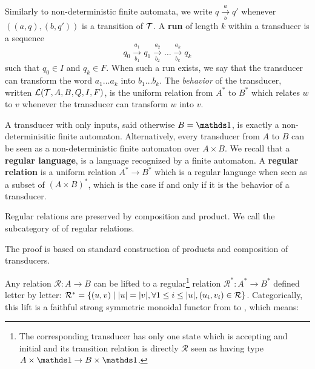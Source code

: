 Similarly to non-deterministic finite automata, we write $q \xrightarrow[b]{a} q'$ whenever $((a,q),(b,q'))$ is a transition of ${\mathcal{T}}$. A \textbf{run} of length $k$ within a transducer is a sequence
\[ q_0 \xrightarrow[b_1]{a_1} q_1 \xrightarrow[b_2]{a_2} \dots \xrightarrow[b_k]{a_k} q_k \]
such that $q_0 \in I$ and $q_k \in F$. When such a run exists, we say that the transducer can transform the word $a_1\dots a_k$ into $b_1\dots b_k$. The \emph{behavior} of the transducer, written ${\mathcal{L}}({\mathcal{T}}, A, B, Q, I, F)$, is the uniform relation from $A^*$ to $B^*$ which relates $w$ to $v$ whenever the transducer can transform $w$ into $v$. 

A transducer with only inputs, said otherwise $B=\one$, is exactly a non-determinisitic finite automaton. Alternatively, every transducer from $A$ to $B$ can be seen as a non-deterministic finite automaton over $A \times B$. We recall that a \textbf{regular language}, is a language recognized by a finite automaton. 
A \textbf{regular relation} is a uniform relation $A^* \to B^* $ which is a regular language when seen as a subset of $(A\times B)^*$, which is the case if and only if it is the behavior of a transducer. 

\begin{proposition}\label{prop:RegRel-is-cat}
	Regular relations are preserved by composition and product. We call  the subcategory of  of regular relations.
\end{proposition}

The proof is based on standard construction of products and composition of transducers.


Any relation $\mathcal{R}:A\to B$ can be lifted to a regular\footnote{The corresponding transducer has only one state which is accepting and initial and its transition relation is directly $\mathcal{R}$ seen as having type $A\times \one \to B\times \one $.} relation $\mathcal{R}^* : A^* \to B^* $ defined letter by letter: $\mathcal{R}^* = \{ (u,v) \mid |u| = |v|, \forall 1 \leq i \leq |u|, (u_i,v_i) \in {\mathcal{R}}\}$. Categorically, this lift is a faithful strong symmetric monoidal functor from  to , which means:

